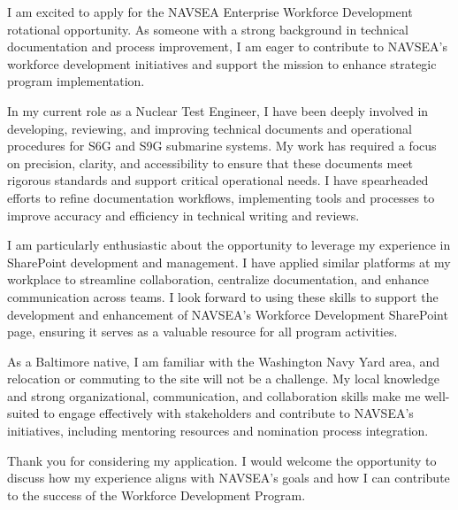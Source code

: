 I am excited to apply for the NAVSEA Enterprise Workforce Development rotational opportunity.
As someone with a strong background in technical documentation and process improvement, I am eager to contribute to NAVSEA's workforce development initiatives and support the mission to enhance strategic program implementation.

In my current role as a Nuclear Test Engineer, I have been deeply involved in developing, reviewing, and improving technical documents and operational procedures for S6G and S9G submarine systems.
My work has required a focus on precision, clarity, and accessibility to ensure that these documents meet rigorous standards and support critical operational needs.
I have spearheaded efforts to refine documentation workflows, implementing tools and processes to improve accuracy and efficiency in technical writing and reviews.

I am particularly enthusiastic about the opportunity to leverage my experience in SharePoint development and management.
I have applied similar platforms at my workplace to streamline collaboration, centralize documentation, and enhance communication across teams.
I look forward to using these skills to support the development and enhancement of NAVSEA's Workforce Development SharePoint page, ensuring it serves as a valuable resource for all program activities.

As a Baltimore native, I am familiar with the Washington Navy Yard area, and relocation or commuting to the site will not be a challenge.
My local knowledge and strong organizational, communication, and collaboration skills make me well-suited to engage effectively with stakeholders and contribute to NAVSEA's initiatives, including mentoring resources and nomination process integration.

Thank you for considering my application.
I would welcome the opportunity to discuss how my experience aligns with NAVSEA's goals and how I can contribute to the success of the Workforce Development Program.

